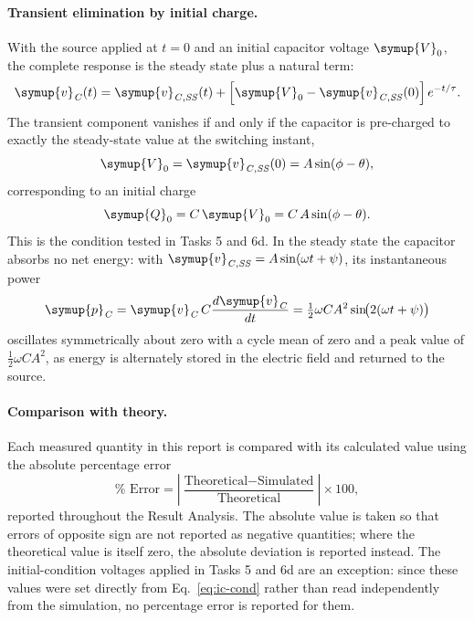 \documentclass[12pt,a4paper]{article}
\begin{document}
	\paragraph{Transient elimination by initial charge.}
	With the source applied at $t = 0$ and an initial capacitor voltage
	$\symup{V}_{0}$, the complete response is the steady state plus a natural term:
	\begin{equation}
		\symup{v}_{\mathit{C}}(t) = \symup{v}_{\mathit{C,SS}}(t)
		+ \left[\symup{V}_{0} - \symup{v}_{\mathit{C,SS}}(0)\right] e^{-t/\tau}.
		\label{eq:complete-sine}
	\end{equation}
	The transient component vanishes if and only if the capacitor is
	pre-charged to exactly the steady-state value at the switching
	instant,
	\begin{equation}
		\symup{V}_{0} = \symup{v}_{\mathit{C,SS}}(0) = A \sin(\phi - \theta),
		\label{eq:ic-cond}
	\end{equation}
	corresponding to an initial charge
	\begin{equation}
		\symup{Q}_{0} = C\,\symup{V}_{0} = C\,A\sin(\phi - \theta).
		\label{eq:q0}
	\end{equation}
	This is the condition tested in Tasks 5 and 6d.  In the steady state
	the capacitor absorbs no net energy: with
	$\symup{v}_{\mathit{C,SS}} = A\sin(\omega t + \psi)$, its instantaneous power
	\begin{equation}
		\symup{p}_{\mathit{C}} = \symup{v}_{\mathit{C}}\,C\frac{d\symup{v}_{\mathit{C}}}{dt}
		= \tfrac{1}{2}\omega C A^{2}\sin\!\bigl(2(\omega t + \psi)\bigr)
		\label{eq:pcap}
	\end{equation}
	oscillates symmetrically about zero with a cycle mean of zero and a
	peak value of $\tfrac{1}{2}\omega C A^{2}$, as energy is alternately
	stored in the electric field and returned to the source.
	
	\paragraph{Comparison with theory.}
	Each measured quantity in this report is compared with its calculated
	value using the absolute percentage error
	\begin{equation}
		\% \text{ Error} =
		\left|\frac{\text{Theoretical} - \text{Simulated}}{\text{Theoretical}}\right|
		\times 100 ,
		\label{eq:perr}
	\end{equation}
	reported throughout the Result Analysis.  The absolute value is taken
	so that errors of opposite sign are not reported as negative
	quantities; where the theoretical value is itself zero, the absolute
	deviation is reported instead. The
	initial-condition voltages applied in Tasks 5 and 6d are an
	exception: since these values were set directly from
	Eq.~\eqref{eq:ic-cond} rather than read independently from the
	simulation, no percentage error is reported for them.
	
\end{document}
